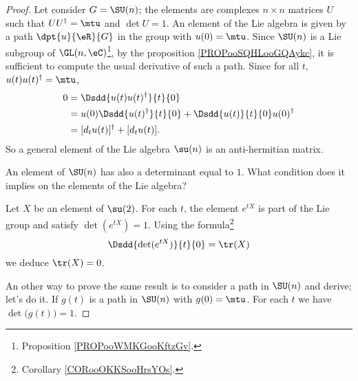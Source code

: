\begin{proof}
    Let consider $G=\SU(n)$; the elements are complexes $n\times n$ matrices $U$ such that $UU^{\dag}=\mtu$ and $\det U=1$. An element of the Lie algebra is given by a path $\dpt{u}{\eR}{G}$ in the group with $u(0)=\mtu$. Since \( \SU(n)\) is a Lie subgroup of \( \GL(n,\eC)\)\footnote{Proposition \ref{PROPooWMKGooKftzGv}.}, by the proposition \ref{PROPooSQHLooGQAykc}, it is sufficient to compute the usual derivative of such a path.
    Since for all $t$, $u(t)u(t)^{\dag}=\mtu$,
    \begin{subequations}
        \begin{align}
      0&=\Dsdd{u(t)u(t)^{\dag}}{t}{0}\\
       &=u(0)\Dsdd{u(t)^{\dag}}{t}{0}+\Dsdd{u(t)}{t}{0}u(0)^{\dag}\\
       &=[d_tu(t)]^{\dag}+[d_tu(t)].
        \end{align}
    \end{subequations}
    So a general element of the Lie algebra $\su(n)$ is an anti-hermitian matrix.

    An element of \( \SU(n)\) has also a determinant equal to \( 1\). What condition does it implies on the elements of the Lie algebra? 
    
    Let \( X\) be an element of \( \su(2)\). For each \( t\), the element \(  e^{tX}\) is part of the Lie group and satisfy \( \det( e^{tX})=1\). Using the formula\footnote{Corollary \ref{CORooOKKSooHrsYOs}.}
    \begin{equation}
        \Dsdd{ \det( e^{tX}) }{t}{0}=\tr(X)
    \end{equation}
    we deduce \( \tr(X)=0\).
    
    An other way to prove the same result is to consider a path in \( \SU(n)\) and derive; let's do it. If \( g(t)\) is a path in \( \SU(n)\) with \( g(0)=\mtu\). For each \( t\) we have \( \det\big( g(t) \big)=1\).
    

\end{proof}
